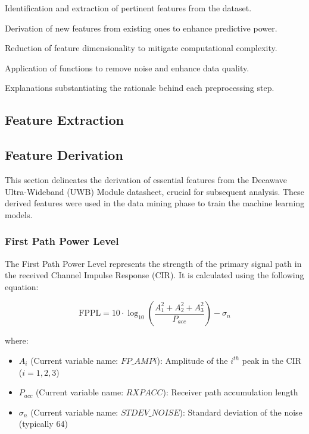\documentclass[
	article, %
	11pt, %
]{CSUniSchoolLabReport}
\begin{document}
\begin{description}[style=nextline]
    \item[Feature Extraction:] Identification and extraction of pertinent features from the dataset.
    \item[Feature Derivation:] Derivation of new features from existing ones to enhance predictive power.
    \item[Feature Reduction:] Reduction of feature dimensionality to mitigate computational complexity.
    \item[De-Noise Functions:] Application of functions to remove noise and enhance data quality.
    \item[Justifications of Processes:] Explanations substantiating the rationale behind each preprocessing step.
\end{description}

\subsection{Feature Extraction}\label{feature_extraction}


\subsection{Feature Derivation}\label{feature_derivation}

This section delineates the derivation of essential features from the Decawave Ultra-Wideband (UWB) Module datasheet, crucial for subsequent analysis. These derived features were used in the data mining phase to train the machine learning models.

\subsubsection{First Path Power Level}\label{first_path_power_level}

The First Path Power Level represents the strength of the primary signal path in the received Channel Impulse Response (CIR). It is calculated using the following equation:

\begin{equation}
  \text{FPPL} = 10 \cdot \log_{10} \left( \frac{A_1^2 + A_2^2 + A_3^2}{P_{acc}} \right) - \sigma_n
\end{equation}

where:

\begin{itemize}
  \item $A_i$ (Current variable name: $FP\_AMPi$): Amplitude of the $i^{th}$ peak in the CIR ($i = 1, 2, 3$)
  \item $P_{acc}$ (Current variable name: $RXPACC$): Receiver path accumulation length
  \item $\sigma_n$ (Current variable name: $STDEV\_NOISE$): Standard deviation of the noise (typically 64)
\end{itemize}
\end{document}
